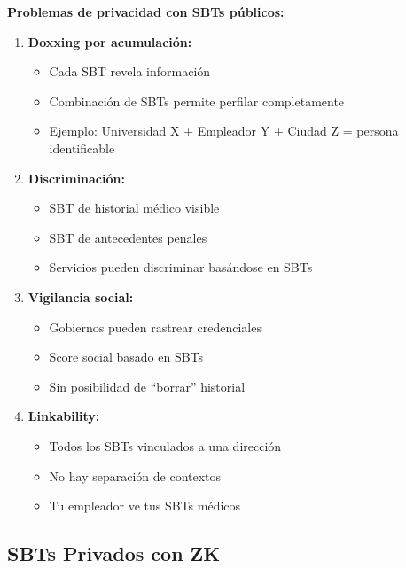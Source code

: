 \documentclass[11pt,a4paper,twoside]{book}
\theoremstyle{definition}
\theoremstyle{remark}
\begin{document}
\begin{advertencia}
\textbf{Problemas de privacidad con SBTs públicos:}

\begin{enumerate}
    \item \textbf{Doxxing por acumulación:}
    \begin{itemize}
        \item Cada SBT revela información
        \item Combinación de SBTs permite perfilar completamente
        \item Ejemplo: Universidad X + Empleador Y + Ciudad Z = persona identificable
    \end{itemize}
    
    \item \textbf{Discriminación:}
    \begin{itemize}
        \item SBT de historial médico visible
        \item SBT de antecedentes penales
        \item Servicios pueden discriminar basándose en SBTs
    \end{itemize}
    
    \item \textbf{Vigilancia social:}
    \begin{itemize}
        \item Gobiernos pueden rastrear credenciales
        \item Score social basado en SBTs
        \item Sin posibilidad de ``borrar'' historial
    \end{itemize}
    
    \item \textbf{Linkability:}
    \begin{itemize}
        \item Todos los SBTs vinculados a una dirección
        \item No hay separación de contextos
        \item Tu empleador ve tus SBTs médicos
    \end{itemize}
\end{enumerate}
\end{advertencia}

\subsection{SBTs Privados con ZK}
\end{document}
